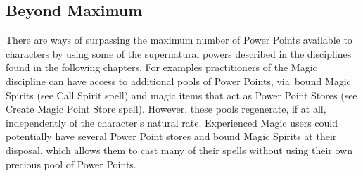 \subsection{Beyond Maximum}
There are ways of surpassing the maximum number of Power Points available to characters by using some of the supernatural powers described in the disciplines found in the following chapters. For examples practitioners of the Magic discipline can have access to additional pools of Power Points, via bound Magic Spirits (see Call Spirit spell) and magic items that act as Power Point Stores (see Create Magic Point Store spell). However, these pools regenerate, if at all, independently of the character’s natural rate. Experienced Magic users could potentially have several Power Point stores and bound Magic Spirits at their disposal, which allows them to cast many of their spells without using their own precious pool of Power Points.


